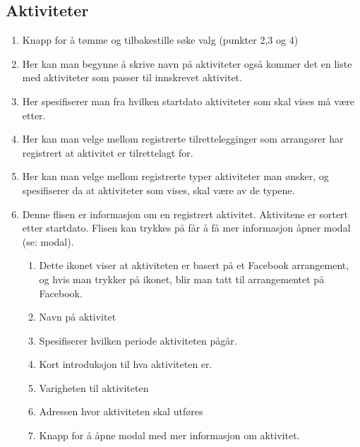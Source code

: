 \subsection{Aktiviteter}
\begin{center}
\end{center}
\begin{enumerate}[nosep]
    \item Knapp for å tømme og tilbakestille søke valg (punkter 2,3 og 4)
    \item Her kan man begynne å skrive navn på aktiviteter også kommer det en liste med aktiviteter som passer til innskrevet aktivitet.
    \item Her spesifiserer man fra hvilken startdato aktiviteter som skal vises må være etter.
    \item Her kan man velge mellom registrerte tilrettelegginger som arrangører har registrert at aktivitet er tilrettelagt for.
    \item Her kan man velge mellom registrerte typer aktiviteter man ønsker, og spesifiserer da at aktiviteter som vises, skal være av de typene.
    \item Denne flisen er informasjon om en registrert aktivitet. Aktivitene er sortert etter startdato. Flisen kan trykkes på får å få mer informasjon åpner modal (se: modal).
    \begin{enumerate}
        \item Dette ikonet viser at aktiviteten er basert på et Facebook arrangement, og hvis man trykker på ikonet, blir man tatt til arrangementet på Facebook.
        \item Navn på aktivitet
        \item Spesifiserer hvilken periode aktiviteten pågår. 
        \item Kort introduksjon til hva aktiviteten er.
        \item Varigheten til aktiviteten
        \item Adressen hvor aktiviteten skal utføres
        \item Knapp for å åpne modal med mer informasjon om aktivitet.
    \end{enumerate}
\end{enumerate}

